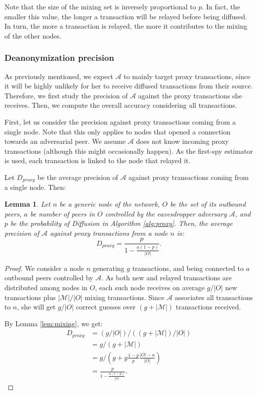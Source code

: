 \documentclass{article}
\newtheorem{lemm}{Lemma}
\begin{document}
	Note that the size of the mixing set is inversely proportional to $p$.
	In fact, the smaller this value, the longer a transaction will be relayed before being diffused.
	In turn, the more a transaction is relayed, the more it contributes to the mixing of the other nodes.
	
	\subsubsection{Deanonymization precision}
	As previously mentioned, we expect $\mathcal{A}$ to mainly target proxy transactions, since it will be highly unlikely for her to receive diffused transactions from their source.
	Therefore, we first study the precision of $\mathcal{A}$ against the proxy transactions she receives.
	Then, we compute the overall accuracy considering all transactions.
	
	First, let us consider the precision against proxy transactions coming from a single node.
	Note that this only applies to nodes that opened a connection towards an adversarial peer.
	We assume $\mathcal{A}$ does not know incoming proxy transactions (although this might occasionally happen).
	As the first-spy estimator is used, each transaction is linked to the node that relayed it.
	
	Let $D_{proxy}$ be the average precision of $\mathcal{A}$ against proxy transactions coming from a single node. Then:
	\begin{lemm}
		\label{lem:dproxy}
		Let $n$ be a generic node of the network, $O$ be the set of its outbound peers, $a$ be number of peers in $O$ controlled by the eavesdropper adversary $\mathcal{A}$, and $p$ be the probability of Diffusion in Algorithm \ref{alg:proxy}.
		Then, the average precision of $\mathcal{A}$ against proxy transactions from a node $n$ is:
		\begin{equation}
			D_{proxy} = \frac{p}{1-\frac{a(1-p)}{|O|}} .
		\end{equation}
	\end{lemm}
	\begin{proof}
		We consider a node $n$ generating $g$ transactions, and being connected to $a$ outbound peers controlled by $\mathcal{A}$.
		As both new and relayed transactions are distributed among nodes in $O$, each such node receives on average $g/|O|$ new transactions plus $|\mathcal{M}|/|O|$ mixing transactions.
		Since $\mathcal{A}$ associates all transactions to $n$, she will get $g/|O|$ correct guesses over $(g+|\mathcal{M}|)$ transactions received.
		
		By Lemma \ref{lem:mixing}, we get:
		\begin{equation}
			\begin{split}
				D_{proxy}&=(g/|O|)/((g+|\mathcal{M}|)/|O|)\\
				&=g/(g+|\mathcal{M}|)\\
				&=g/(g+g\frac{1-p}{p}\frac{|O|-a}{|O|})\\
				&=\frac{p}{1-\frac{a(1-p)}{|O|}}.
			\end{split}
		\end{equation}
	\end{proof}
	
\end{document}
